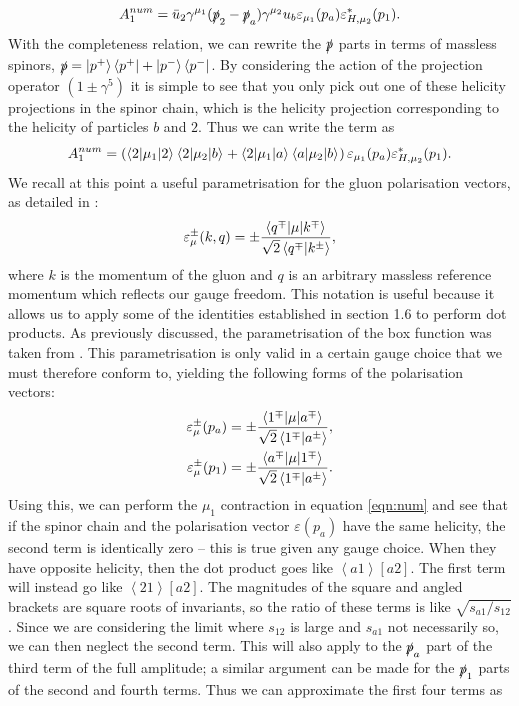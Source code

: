 \begin{equation}
A_1^{num} = \bar{u}_2 \gamma^{\mu_1}(\slashed{p}_2-\slashed{p}_a)\gamma^{\mu_2}u_b \varepsilon_{\mu_1}(p_a)\varepsilon^*_{H,\mu_2}(p_1).
\end{equation}
With the completeness relation, we can rewrite the $\slashed{p}$ parts in terms of massless spinors,  $\slashed{p} = \left| p^+ \right> \left<p^+ \right| + \left| p^- \right> \left<p^- \right|$. By considering the action of the projection operator $(1\pm \gamma^5)$ it is simple to see that you only pick out one of these helicity projections in the spinor chain, which is the helicity projection corresponding to the helicity of particles $b$ and $2$. Thus we can write the term as
\begin{equation}
A_1^{num} = \left(\mathinner{\langle2\vert\mu_1\vert2\rangle}_{}\mathinner{\langle2\vert\mu_2\vert b\rangle}_{} + \mathinner{\langle2\vert\mu_1\vert a\rangle}_{}\mathinner{\langle a\vert\mu_2\vert b\rangle}_{}\right)\varepsilon_{\mu_1}(p_a)\varepsilon^*_{H,\mu_2}(p_1).
\label{eqn:num}
\end{equation}
We recall at this point a useful parametrisation for the gluon polarisation vectors, as detailed in \cite{Dixon1996}:
\begin{equation}
\varepsilon_\mu^{\pm}(k,q) = \pm \frac{\mathinner{\langle q^\mp\vert\mu\vert k^\mp\rangle}_{}}{\sqrt{2} \left<q^\mp | k^\pm \right>},
\end{equation}
where $k$ is the momentum of the gluon and $q$ is an arbitrary massless reference momentum which reflects our gauge freedom. This notation is useful because it allows us to apply some of the identities established in section 1.6 to perform dot products. As previously discussed, the parametrisation of the box function was taken from \cite{Duca2003}. This parametrisation is only valid in a certain gauge choice that we must therefore conform to, yielding the following forms of the polarisation vectors:
\begin{equation}
\begin{split}
\varepsilon_\mu^{\pm}(p_a) &= \pm \frac{\mathinner{\langle1^\mp\vert\mu\vert a^\mp\rangle}_{}}{\sqrt{2} \left<1^\mp | a^\pm \right>}, \\
\varepsilon_\mu^{\pm}(p_1) &= \pm \frac{\mathinner{\langle a^\mp\vert\mu\vert1^\mp\rangle}_{}}{\sqrt{2} \left<1^\mp | a^\pm \right>}.
\end{split}
\end{equation}
Using this, we can perform the $\mu_1$ contraction in equation \ref{eqn:num} and see that if the spinor chain and the polarisation vector $\varepsilon(p_a)$ have the same helicity, the second term is identically zero -- this is true given any gauge choice. When they have opposite helicity, then the dot product goes like $\left<a 1 \right> [ a 2]$. The first term will instead go like $\left<2 1 \right>[a 2]$. The magnitudes of the square and angled brackets are square roots of invariants, so the ratio of these terms is like $\sqrt{s_{a1}/s_{12}}$. Since we are considering the limit where $s_{12}$ is large and $s_{a1}$ not necessarily so, we can then neglect the second term. This will also apply to the $\slashed{p}_a$ part of the third term of the full amplitude; a similar argument can be made for the $\slashed{p}_1$ parts of the second and fourth terms. Thus we can approximate the first four terms as %
